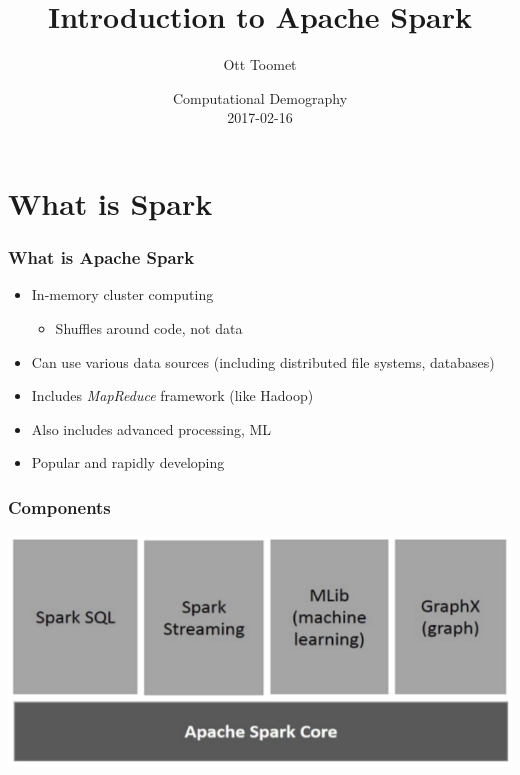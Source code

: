\documentclass[mathserif, xcolor=table, svgnames]{beamer}
\title{Introduction to Apache Spark}
\author{Ott Toomet}
\date{Computational Demography\\
2017-02-16}
\begin{document}

\begin{frame}
  \maketitle
\end{frame}

\section{What is Spark}

\begin{frame}
  \frametitle{What is Apache Spark}
  \begin{itemize}
  \item In-memory cluster computing
    \begin{itemize}
    \item Shuffles around code, not data
    \end{itemize}
  \item Can use various data sources (including distributed file
    systems, databases)
  \item Includes \emph{MapReduce} framework (like Hadoop)
  \item Also includes advanced processing, ML
  \item Popular and rapidly developing
  \end{itemize}
\end{frame}

\begin{frame}
  \frametitle{Components}
  \includegraphics{components_of_spark.png}
\end{frame}
\end{document}
